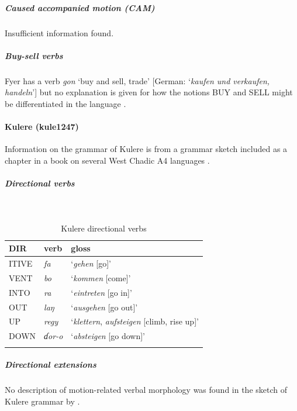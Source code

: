 \subparagraph{Caused accompanied motion (CAM)}



Insufficient information found. 

\subparagraph{Buy-sell verbs}



Fyer has a verb \textit{gon} `buy and sell, trade' [German: `\textit{kaufen und verkaufen, handeln}'] but no explanation is given for how the notions BUY and SELL might be differentiated in the language \citep[85]{jungraithmayrRonSprachenTaschadohamitischeStudien1970}. 

\paragraph*{Kulere (kule1247)}

Information on the grammar of Kulere is from a grammar sketch included as a chapter in a book on several West Chadic A4 languages \citep{jungraithmayrRonSprachenTaschadohamitischeStudien1970}.

\subparagraph{Directional verbs}~



\begin{table}[H]
	\caption{Kulere directional verbs} 
	\label{tab:kuleV}
	\begin{tabular}{lll} %
		\lsptoprule
		DIR & verb & gloss   \\ %
		\midrule
		ITIVE & \textit{fa} & `\textit{gehen} [go]' \\
		VENT & \textit{bo} & `\textit{kommen} [come]' \\
		INTO& \textit{ra} & `\textit{eintreten} [go in]' \\
		OUT & \textit{laŋ} & `\textit{ausgehen} [go out]' \\
		UP & \textit{regy} & `\textit{klettern}, \textit{aufsteigen} [climb, rise up]' \\
		DOWN & \textit{ɗor-o} & `\textit{absteigen} [go down]' \\
		\lspbottomrule
	\end{tabular}
\end{table}

\subparagraph{Directional extensions}



No description of motion-related verbal morphology was found in the sketch of Kulere grammar by \citet[295--360]{jungraithmayrRonSprachenTaschadohamitischeStudien1970}.

